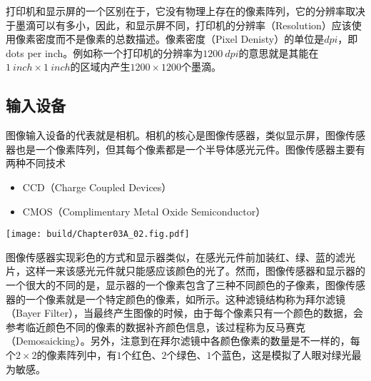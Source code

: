打印机和显示屏的一个区别在于，它没有物理上存在的像素阵列，它的分辨率取决于墨滴可以有多小，因此，和显示屏不同，打印机的分辨率（Resolution）应该使用像素密度而不是像素的总数描述。像素密度（Pixel Denisty）的单位是$\si{dpi}$，即dots per inch。例如称一个打印机的分辨率为$\SI{1200}{dpi}$的意思就是其能在$\SI{1}{inch}\times\SI{1}{inch}$的区域内产生$1200\times 1200$个墨滴。

\subsection{输入设备}
图像输入设备的代表就是相机。相机的核心是图像传感器，类似显示屏，图像传感器也是一个像素阵列，但其每个像素都是一个半导体感光元件。图像传感器主要有两种不同技术
\begin{itemize}
    \item CCD（Charge Coupled Devices）
    \item CMOS（Complimentary Metal Oxide Semiconductor）
\end{itemize}
\begin{Figure}[彩色图像传感器的原理]
    \texttt{[image: build/Chapter03A\_02.fig.pdf]}
\end{Figure}
图像传感器实现彩色的方式和显示器类似，在感光元件前加装红、绿、蓝的滤光片，这样一来该感光元件就只能感应该颜色的光了。然而，图像传感器和显示器的一个很大的不同的是，显示器的一个像素包含了三种不同颜色的子像素，图像传感器的一个像素就是一个特定颜色的像素，如所示。这种滤镜结构称为拜尔滤镜（Bayer Filter），当最终产生图像的时候，由于每个像素只有一个颜色的数据，会参考临近颜色不同的像素的数据补齐颜色信息，该过程称为反马赛克（Demosaicking）。另外，注意到在拜尔滤镜中各颜色像素的数量是不一样的，每个$2\times 2$的像素阵列中，有$1$个红色、$2$个绿色、$1$个蓝色，这是模拟了人眼对绿光最为敏感。
